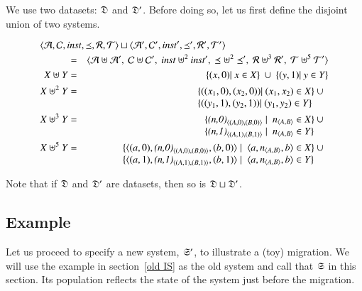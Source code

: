 \documentclass{elsarticle}
\begin{document}
   We use two datasets: $\mathfrak{D}$ and $\mathfrak{D}'$.
   Before doing so, let us first define the disjoint union of two systems.
\begin{definition}
\begin{eqnarray}
   \omit\rlap{$\la\atoms,\concepts,\inst,\isa,\rels,\triples\ra\sqcup\la\atoms',\concepts',\inst',\isa',\rels',\triples'\ra$}\notag\\
   &=&\la\atoms\uplus\atoms',\ \concepts\uplus\concepts',\ \inst\uplus^2\inst',\ \isa\uplus^2\isa',\ \rels\uplus^3\rels',\ \triples\uplus^5\triples'\ra\notag\\
      X\uplus Y&=&\{(x,0)|\ x\in X\}\ \cup\ \{(y,1)|\ y\in Y\}\\
      X\uplus^2 Y&=&\begin{array}[t]{@{}l}\{((x_1,0),(x_2,0))|\ (x_1,x_2)\in X\}\ \cup\\ \{((y_1,1),(y_2,1))|\ (y_1,y_2)\in Y\}\end{array}\\
      X\uplus^3 Y&=&\begin{array}[t]{@{}l}\{\declare{(n,0)}{(A,0)}{(B,0)}\mid\ \declare{n}{A}{B}\in X\}\ \cup\\ \{\declare{(n,1)}{(A,1)}{(B,1)}\mid\ \declare{n}{A}{B}\in Y\}\end{array}\\
      X\uplus^5 Y&=&\begin{array}[t]{@{}l}\{\triple{(a,0)}{\declare{(n,0)}{(A,0)}{(B,0)}}{(b,0)}\mid\ \triple{a}{\declare{n}{A}{B}}{b}\in X\}\ \cup\\ \{\triple{(a,1)}{\declare{(n,1)}{(A,1)}{(B,1)}}{(b,1)}\mid\ \triple{a}{\declare{n}{A}{B}}{b}\in Y\}\end{array}
\end{eqnarray}
\end{definition}
Note that if $\mathfrak{D}$ and $\mathfrak{D}'$ are datasets, then so is $\mathfrak{D}\sqcup\mathfrak{D}'$.

\subsection{Example}
   Let us proceed to specify a new system, $\mathfrak{S}'$, to illustrate a (toy) migration.
   We will use the example in section~\ref{old IS} as the old system
   and call that $\mathfrak{S}$ in this section.
   Its population reflects the state of the system just before the migration.
\end{document}
